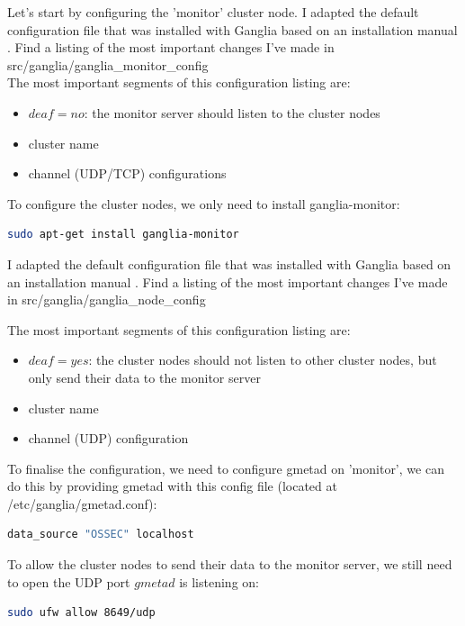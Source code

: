 \documentclass[12pt]{report}
\begin{document}
Let's start by configuring the 'monitor' cluster node. I adapted the
default configuration file that was installed with Ganglia based on an
 installation manual \cite{ganglia_install_manual}.
Find a listing of the most important changes I've made in \\
src/ganglia/ganglia\_monitor\_config \\

The most important segments of this configuration listing are:
\begin{itemize}
\item $deaf = no$: the monitor server should listen to the cluster
  nodes
\item cluster name
\item channel (UDP/TCP) configurations
\end{itemize}

To configure the cluster nodes, we only need to install ganglia-monitor:
\begin{lstlisting}[language=bash]
sudo apt-get install ganglia-monitor
\end{lstlisting} 

I adapted the
default configuration file that was installed with Ganglia based on an
 installation manual \cite{ganglia_install_manual}.
Find a listing of the most important changes I've made in
src/ganglia/ganglia\_node\_config

The most important segments of this configuration listing are:
\begin{itemize}
\item $deaf = yes$: the cluster nodes should not listen to other
  cluster nodes, but only send their data to the monitor server
\item cluster name
\item channel (UDP) configuration
\end{itemize}

To finalise the configuration, we need to configure gmetad on
'monitor', we can do this by providing gmetad with this config file
(located at /etc/ganglia/gmetad.conf):
\begin{lstlisting}[language=bash]
data_source "OSSEC" localhost
\end{lstlisting} 

To allow the cluster nodes to send their data to the monitor server,
we still need to open the UDP port $gmetad$ is listening on:
 \begin{lstlisting}[language=bash]
sudo ufw allow 8649/udp
\end{lstlisting} 
\end{document}
